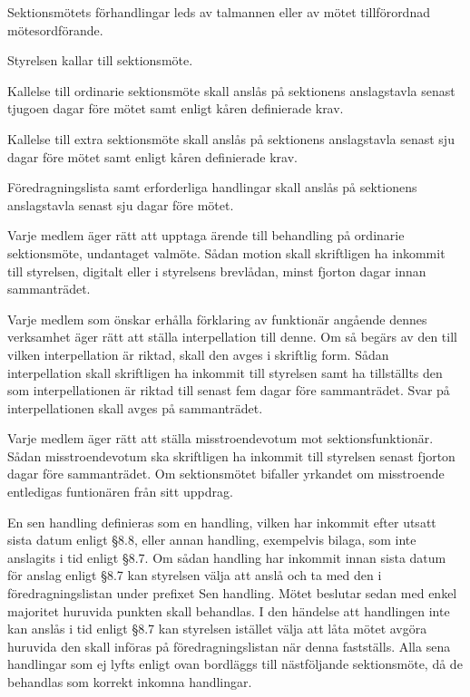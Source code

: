 \documentclass[stadgar]{dsekprotokoll}
\begin{document}
\begin{stadgeavsnitt}

Sektionsmötets förhandlingar leds av talmannen eller av mötet tillförordnad
mötesordförande.


Styrelsen kallar till sektionsmöte.

Kallelse till ordinarie sektionsmöte skall anslås på sektionens anslagstavla senast tjugoen dagar före mötet samt enligt kåren definierade krav.

Kallelse till extra sektionsmöte skall anslås på sektionens anslagstavla senast sju dagar före mötet samt enligt kåren definierade krav.


Föredragningslista samt erforderliga handlingar skall anslås på sektionens anslagstavla
senast sju dagar före mötet.


Varje medlem äger rätt att upptaga ärende till behandling på ordinarie sektionsmöte, undantaget valmöte. Sådan motion skall skriftligen ha inkommit till styrelsen, digitalt eller i styrelsens brevlådan, minst fjorton dagar innan sammanträdet.

Varje medlem som önskar erhålla förklaring av funktionär angående dennes verksamhet äger rätt att ställa interpellation till denne. Om så begärs av den till vilken interpellation är riktad, skall den avges i skriftlig form. Sådan interpellation skall skriftligen ha inkommit till styrelsen samt ha tillställts den som interpellationen är riktad till senast fem dagar före sammanträdet. Svar på interpellationen skall avges på sammanträdet.


Varje medlem äger rätt att ställa misstroendevotum mot sektionsfunktionär. Sådan misstroendevotum ska skriftligen ha inkommit till styrelsen senast fjorton dagar före sammanträdet. Om sektionsmötet bifaller yrkandet om misstroende entledigas funtionären från sitt uppdrag.

En sen handling definieras som en handling, vilken har inkommit efter utsatt sista datum enligt
\S8.8, eller annan handling, exempelvis bilaga, som inte anslagits i tid enligt \S8.7. Om sådan
handling har inkommit innan sista datum för anslag enligt \S8.7 kan styrelsen välja att anslå och
ta med den i föredragningslistan under prefixet Sen handling. Mötet beslutar sedan med enkel
majoritet huruvida punkten skall behandlas. I den händelse att handlingen inte kan anslås i
tid enligt \S8.7 kan styrelsen istället välja att låta mötet avgöra huruvida den skall införas på föredragningslistan
när denna fastställs. Alla sena handlingar som ej lyfts enligt ovan bordläggs
till nästföljande sektionsmöte, då de behandlas som korrekt inkomna handlingar.


\end{stadgeavsnitt}
\end{document}

